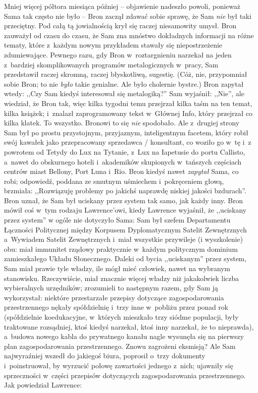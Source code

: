 \documentclass[oneside,polish,11pt,rmheadings]{mwbk}
\begin{document}
Mniej więcej półtora miesiąca później -- objawienie nadeszło powoli, ponieważ Sama tak często nie było -- Bron zaczął zdawać sobie sprawę, że Sam \textit{nie }był taki przeciętny. Pod całą tą jowialnością krył się raczej niesamowity umysł. Bron zauważył od czasu do czasu, że Sam zna mnóstwo dokładnych informacji na różne tematy, które z~każdym nowym przykładem stawały się niepostrzeżenie zdumiewające. Pewnego razu, gdy Bron w~roztargnieniu narzekał na jeden z~bardziej skomplikowanych programów metalogicznych w~pracy, Sam przedstawił raczej skromną, raczej błyskotliwą, sugestię. (Cóż, nie, przypomniał sobie Bron; to nie \textit{było } takie genialne. Ale było cholernie bystre.) Bron zapytał wtedy: ,,Czy Sam kiedyś interesował się metalogiką?'' Sam wyjaśnił: ,,Nie'', ale wiedział, że Bron tak, więc kilka tygodni temu przejrzał kilka taśm na ten temat, kilka książek; i~znalazł zaprogramowany tekst w~Głównej Info, który przejrzał co kilka klatek. To wszystko. Bronowi to się \textit{nie } spodobało. Ale z~drugiej strony Sam był po prostu przystojnym, przyjaznym, inteligentnym facetem, który robił swój kawałek jako przepracowany sprzedawca / konsultant, co woziło go w~tę i~z powrotem od Tetydy do Lux na Tytanie, z~Lux na Iapetusie do portu Callisto, a~nawet do obskurnego hoteli i~akademików skupionych w~tańszych częściach centrów miast Bellony, Port Luna i~Rio. Bron kiedyś nawet \textit{zapytał  }Sama, co robi; odpowiedź, poddana ze smutnym uśmiechem i~pokręceniem głową, brzmiała: ,,Rozwiązuję problemy po jakichś naprawdę niskiej jakości bzdurach''. Bron uznał, że Sam był uciskany przez system tak samo, jak każdy inny. Bron mówił coś w~tym rodzaju Lawrence'owi, kiedy Lawrence wyjaśnił, że ,,uciskany przez system'' w ogóle nie dotyczyło Sama: Sam był szefem Departamentu Łączności Politycznej między Korpusem Dyplomatycznym Satelit Zewnętrznych a~Wywiadem Satelit Zewnętrznych i~miał wszystkie przywileje (i wyszkolenie) obu: miał immunitet rządowy praktycznie w~każdym politycznym dominium zamieszkałego Układu Słonecznego. Daleki od bycia ,,uciskanym'' przez system, Sam miał prawie tyle władzy, ile mógł mieć człowiek, nawet na wybranym stanowisku. Rzeczywiście, miał znacznie więcej władzy niż jakakolwiek liczba wybieralnych urzędników; zrozumieli to następnym razem, gdy Sam ją wykorzystał: niektóre przestarzałe przepisy dotyczące zagospodarowania przestrzennego nękały spółdzielnię i~trzy inne w~pobliżu przez ponad rok (spółdzielnie koedukacyjne, w~których mieszkało trzy siódme populacji, były traktowane rozsądniej, ktoś kiedyś narzekał, ktoś inny narzekał, że to nieprawda), a~budowa nowego kabla do prywatnego kanału nagle wysunęła się na pierwszy plan zagospodarowania przestrzennego. Znowu zagrożeni eksmisją? Ale Sam najwyraźniej wszedł do jakiegoś biura, poprosił o~trzy dokumenty i~poinstruował, by wyrzucić połowę zawartości jednego z~nich; ujawniły się sprzeczności w~części przepisów dotyczących zagospodarowania przestrzennego. Jak powiedział Lawrence:  
\end{document}
